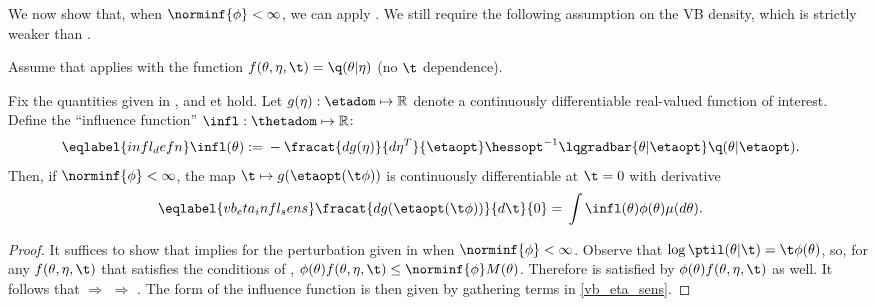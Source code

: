 We now show that, when $\norminf{\phi} < \infty$, we can apply
.  We still require the following assumption on the VB
density, which is strictly weaker than .

\begin{assu}
%
Assume that  applies with the function $f(\theta,
\eta, \t) = \q(\theta \vert \eta)$ (no $\t$ dependence).
%
\end{assu}


\begin{cor}
%
Fix the quantities given in , and  et  hold. Let $g(\eta): \etadom \mapsto \mathbb{R}$ denote a
continuously differentiable real-valued function of interest.  Define the
``influence function'' $\infl: \thetadom \mapsto \mathbb{R}$:
%
\begin{align}\eqlabel{infl_defn}
%
\infl(\theta) :={}&
    - \fracat{d g(\eta)}{ d \eta^T}{\etaopt} \hessopt^{-1}
        \lqgradbar{\theta \vert \etaopt}
        \q(\theta \vert \etaopt).
%
\end{align}
%
Then, if $\norminf{\phi} < \infty$, the map $\t \mapsto g(\etaopt(\t \phi))$ is
continuously differentiable at $\t=0$ with derivative
%
\begin{align}\eqlabel{vb_eta_infl_sens}
%
\fracat{d g(\etaopt(\t \phi))}{d \t}{0} ={}&
    \int \infl(\theta) \phi(\theta) \mu(d\theta).
%
\end{align}
%
\begin{proof}
%
It suffices to show that  implies
 for the perturbation given in 
when $\norminf{\phi} < \infty$.  Observe that $\log \ptil(\theta \vert \t) = \t
\phi(\theta)$, so, for any $f(\theta, \eta, \t)$ that satisfies the conditions
of ,
%
%
$\phi(\theta) f(\theta, \eta, \t) \le \norminf{\phi} M(\theta)$.
%
%
Therefore  is satisfied by $\phi(\theta) f(\theta,
\eta, \t)$ as well.  It follows that  $\Rightarrow$
 $\Rightarrow$ .
%
The form of the influence function is then given by gathering terms in
\eqref{vb_eta_sens}.
%
\end{proof}
%
\end{cor}

